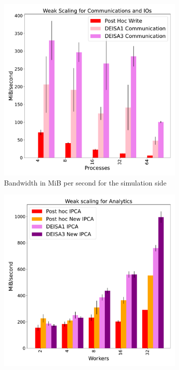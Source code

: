 \begin{figure}[hb]
     \centering
     \begin{subfigure}[b]{0.45\textwidth}
         \centering
         \includegraphics[width=\textwidth, height=\textwidth]{figures/P_1vs3vspost1vspost2.pdf}
         \caption{Bandwidth in MiB per second for the simulation side}
         \label{fig:P}
     \end{subfigure}
     \hfill
     \begin{subfigure}[b]{0.45\textwidth}
         \centering
         \includegraphics[width=\textwidth, height=\textwidth]{figures/A_1vs3vspost1vspost2.pdf}

\end{subfigure}
\end{figure}
